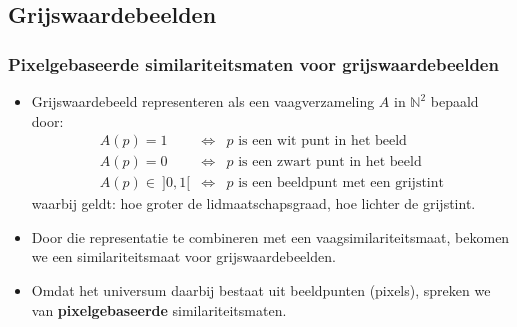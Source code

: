 \documentclass[dutch]{beamer}
\theoremstyle{definition}
\newtheorem{definitie}[theorem]{Definitie}
\theoremstyle{remark}
\theoremstyle{example}
\begin{document}
\subsection{Grijswaardebeelden}
\frame
{
  \frametitle{Pixelgebaseerde similariteitsmaten voor grijswaardebeelden}
  \begin{itemize}
  \item Grijswaardebeeld representeren als een vaagverzameling 
  $A$ in $\mathbb{N}^2$ bepaald door:
  \begin{displaymath}
  \begin{array}{rcl}
  A(p) = 1 & \iff & p \text{ is een wit punt in het beeld} \\
  A(p) = 0 & \iff & p \text{ is een zwart punt in het beeld} \\
  A(p) \in\ ]0,1[ & \iff & p \text{ is een beeldpunt met een grijstint}
  \end{array}
  \end{displaymath}
  waarbij geldt: hoe groter de lidmaatschapsgraad, hoe lichter de grijstint.
  \item Door die representatie te combineren met een vaagsimilariteitsmaat,
  bekomen we een similariteitsmaat voor grijswaardebeelden. 
  \item Omdat het universum daarbij bestaat uit beeldpunten (pixels), spreken we van
  \textbf{pixelgebaseerde} similariteitsmaten.
  \end{itemize}
}
\end{document}

